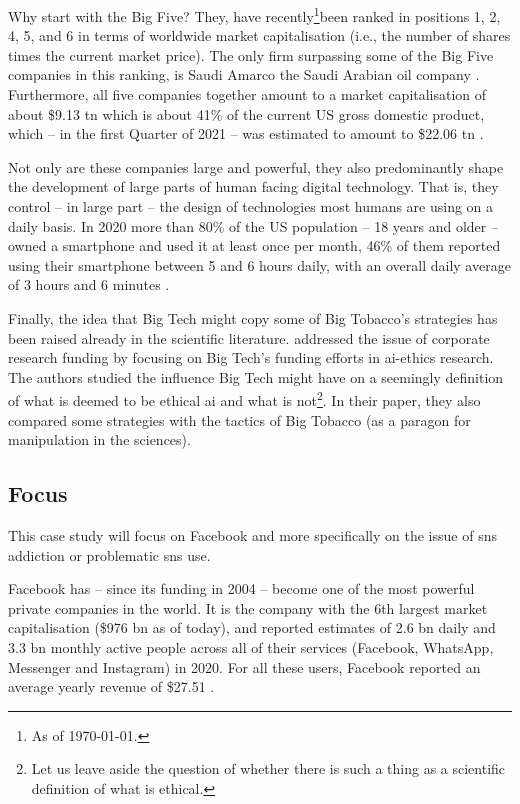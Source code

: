 Why start with the Big Five? They, have recently\footnote{As of \today.}been ranked in positions 1, 2, 4, 5, and 6 in terms of worldwide market capitalisation (i.e., the number of shares times the current market price).
The only firm surpassing some of the Big Five companies in this ranking, is Saudi Amarco the Saudi Arabian oil company \citep{noauthor_largest_2021}. 
Furthermore, all five companies together amount to a market capitalisation of about \$9.13 \gls{tn} which is about 41\% of the current US gross domestic product, which -- in the first Quarter of 2021 -- was estimated to amount to \$22.06 \gls{tn} \citep{bea_gross_2021}.

Not only are these companies large and powerful, they also predominantly shape the development of large parts of human facing digital technology. 
That is, they control -- in large part -- the design of technologies most humans are using on a daily basis. 
In 2020 more than 80\% of the US population -- 18 years and older -- owned a smartphone and used it at least once per month, 46\% of them reported using their smartphone between 5 and 6 hours daily, with an overall daily average of 3 hours and 6 minutes \citep{statista_research_department_time_2020, odea_us_2021, odea_smartphone_2021}. 

Finally, the idea that Big Tech might copy some of Big Tobacco's strategies has been raised already in the scientific literature. 
\citet{abdalla_grey_2021} addressed the issue of corporate research funding by focusing on Big Tech's funding efforts in \gls{ai}-ethics research.
The authors studied the influence Big Tech might have on a seemingly  definition of what is deemed to be ethical \gls{ai} and what is not\footnote{Let us leave aside the question of whether there is such a thing as a scientific definition of what is ethical.}. 
In their paper, they also compared some strategies with the tactics of Big Tobacco (as a paragon for manipulation in the sciences).

\subsection{Focus}
This case study will focus on Facebook and more specifically on the issue of \gls{sns} addiction or problematic \gls{sns} use.

Facebook has  -- since its funding in 2004 -- become one of the most powerful private companies in the world. 
It is the company with the 6th largest market capitalisation (\$976 \gls{bn}\citep{noauthor_largest_2021} as of today), and reported estimates of 2.6 \gls{bn} daily and 3.3 \gls{bn} monthly active people across all of their services (Facebook, WhatsApp, Messenger and Instagram) in 2020.
For all these users, Facebook reported an average yearly revenue of \$27.51 \citep{facebook_annual_2021}.

